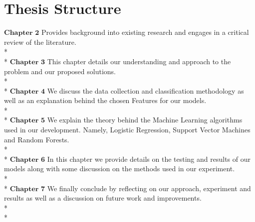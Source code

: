 \section{Thesis Structure}
$\textbf{Chapter 2}$ Provides background into existing research and engages in a critical review of the literature. \\*\\*
$\textbf{Chapter 3}$ This chapter details our understanding and approach to the problem and our proposed solutions. \\*\\*
$\textbf{Chapter 4}$ We discuss the data collection and classification methodology as well as an explanation behind the chosen Features for our models. \\*\\*
$\textbf{Chapter 5}$ We explain the theory behind the Machine Learning algorithms used in our development. Namely, Logistic Regression, Support Vector Machines and Random Forests.  \\*\\*
$\textbf{Chapter 6}$ In this chapter we provide details on the testing and results of our models along with some discussion on the methods used in our experiment. \\*\\*
$\textbf{Chapter 7}$ We finally conclude by reflecting on our approach, experiment and results as well as a discussion on future work and improvements.  \\*\\*

